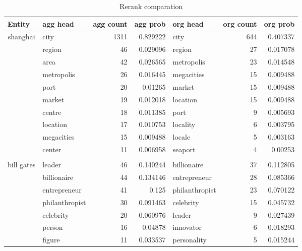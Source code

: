 \begin{table*}[htbp!]
  \centering
  \caption{Rerank comparation}
    \begin{tabular}{llrrlrr}
    \toprule
    Entity & agg head & agg count & agg prob & org head & org count & org prob \\
    \midrule
    \multicolumn{1}{c}{\multirow{10}[0]{*}{shanghai}} & city  & 1311  & 0.829222 & city  & 644   & 0.407337 \\
    \multicolumn{1}{c}{} & region & 46    & 0.029096 & region & 27    & 0.017078 \\
    \multicolumn{1}{c}{} & area  & 42    & 0.026565 & metropolis & 23    & 0.014548 \\
    \multicolumn{1}{c}{} & metropolis & 26    & 0.016445 & megacities & 15    & 0.009488 \\
    \multicolumn{1}{c}{} & port  & 20    & 0.01265 & market & 15    & 0.009488 \\
    \multicolumn{1}{c}{} & market & 19    & 0.012018 & location & 15    & 0.009488 \\
    \multicolumn{1}{c}{} & centre & 18    & 0.011385 & port  & 9     & 0.005693 \\
    \multicolumn{1}{c}{} & location & 17    & 0.010753 & locality & 6     & 0.003795 \\
    \multicolumn{1}{c}{} & megacities & 15    & 0.009488 & locale & 5     & 0.003163 \\
    \multicolumn{1}{c}{} & center & 11    & 0.006958 & seaport & 4     & 0.00253 \\
          &       &       &       &       &       &  \\
    \multicolumn{1}{c}{\multirow{10}[0]{*}{bill gates}} & leader & 46    & 0.140244 & billionaire & 37    & 0.112805 \\
    \multicolumn{1}{c}{} & billionaire & 44    & 0.134146 & entrepreneur & 28    & 0.085366 \\
    \multicolumn{1}{c}{} & entrepreneur & 41    & 0.125 & philanthropist & 23    & 0.070122 \\
    \multicolumn{1}{c}{} & philanthropist & 30    & 0.091463 & celebrity & 15    & 0.045732 \\
    \multicolumn{1}{c}{} & celebrity & 20    & 0.060976 & leader & 9     & 0.027439 \\
    \multicolumn{1}{c}{} & person & 16    & 0.04878 & innovator & 6     & 0.018293 \\
    \multicolumn{1}{c}{} & figure & 11    & 0.033537 & personality & 5     & 0.015244 \\

\end{tabular}
\end{table*}

